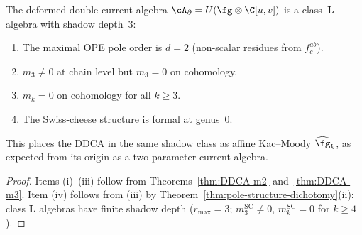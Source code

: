 \begin{proposition}
\label{prop:DDCA-shadow}
The deformed double current algebra
$\cA_\partial = U(\fg \otimes \C[u,v])$ is a
class~$\mathbf{L}$ algebra with shadow depth~$3$:
\begin{enumerate}[label=\textup{(\roman*)},nosep]
\item The maximal OPE pole order is $d = 2$
 (non-scalar residues from $f^{ab}_c$).
\item $m_3 \ne 0$ at chain level but
 $m_3 = 0$ on cohomology.
\item $m_k = 0$ on cohomology for all $k \ge 3$.
\item The Swiss-cheese structure is formal at genus~$0$.
\end{enumerate}
This places the DDCA in the same shadow class as affine
Kac--Moody $\widehat{\fg}_k$, as expected from its
origin as a two-parameter current algebra.
\end{proposition}

\begin{proof}
Items (i)--(iii) follow from
Theorems~\ref{thm:DDCA-m2} and~\ref{thm:DDCA-m3}.
Item (iv) follows from (iii) by
Theorem~\ref{thm:pole-structure-dichotomy}(ii): class
$\mathbf{L}$ algebras have finite shadow depth ($r_{\max} = 3$; $m_3^{\mathrm{SC}} \neq 0$, $m_k^{\mathrm{SC}} = 0$ for $k \ge 4$).
\end{proof}

